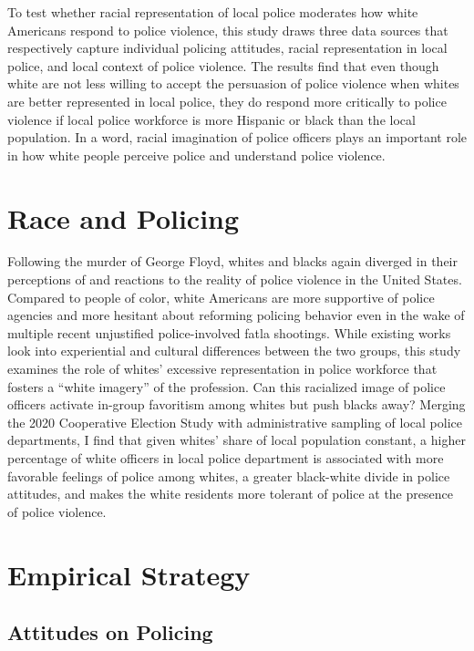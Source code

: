 \documentclass[
  12pt,
]{article}
\begin{document}
To test whether racial representation of local police moderates how
white Americans respond to police violence, this study draws three data
sources that respectively capture individual policing attitudes, racial
representation in local police, and local context of police violence.
The results find that even though white are not less willing to accept
the persuasion of police violence when whites are better represented in
local police, they do respond more critically to police violence if
local police workforce is more Hispanic or black than the local
population. In a word, racial imagination of police officers plays an
important role in how white people perceive police and understand police
violence.

\hypertarget{race-and-policing}{%
\section{Race and Policing}\label{race-and-policing}}

Following the murder of George Floyd, whites and blacks again diverged
in their perceptions of and reactions to the reality of police violence
in the United States. Compared to people of color, white Americans are
more supportive of police agencies and more hesitant about reforming
policing behavior even in the wake of multiple recent unjustified
police-involved fatla shootings. While existing works look into
experiential and cultural differences between the two groups, this study
examines the role of whites' excessive representation in police
workforce that fosters a ``white imagery'' of the profession. Can this
racialized image of police officers activate in-group favoritism among
whites but push blacks away? Merging the 2020 Cooperative Election Study
with administrative sampling of local police departments, I find that
given whites' share of local population constant, a higher percentage of
white officers in local police department is associated with more
favorable feelings of police among whites, a greater black-white divide
in police attitudes, and makes the white residents more tolerant of
police at the presence of police violence.

\hypertarget{empirical-strategy}{%
\section{Empirical Strategy}\label{empirical-strategy}}

\hypertarget{attitudes-on-policing}{%
\subsection{Attitudes on Policing}\label{attitudes-on-policing}}
\end{document}
